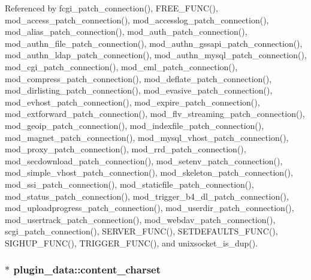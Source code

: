 Referenced by fcgi\-\_\-patch\-\_\-connection(), F\-R\-E\-E\-\_\-\-F\-U\-N\-C(), mod\-\_\-access\-\_\-patch\-\_\-connection(), mod\-\_\-accesslog\-\_\-patch\-\_\-connection(), mod\-\_\-alias\-\_\-patch\-\_\-connection(), mod\-\_\-auth\-\_\-patch\-\_\-connection(), mod\-\_\-authn\-\_\-file\-\_\-patch\-\_\-connection(), mod\-\_\-authn\-\_\-gssapi\-\_\-patch\-\_\-connection(), mod\-\_\-authn\-\_\-ldap\-\_\-patch\-\_\-connection(), mod\-\_\-authn\-\_\-mysql\-\_\-patch\-\_\-connection(), mod\-\_\-cgi\-\_\-patch\-\_\-connection(), mod\-\_\-cml\-\_\-patch\-\_\-connection(), mod\-\_\-compress\-\_\-patch\-\_\-connection(), mod\-\_\-deflate\-\_\-patch\-\_\-connection(), mod\-\_\-dirlisting\-\_\-patch\-\_\-connection(), mod\-\_\-evasive\-\_\-patch\-\_\-connection(), mod\-\_\-evhost\-\_\-patch\-\_\-connection(), mod\-\_\-expire\-\_\-patch\-\_\-connection(), mod\-\_\-extforward\-\_\-patch\-\_\-connection(), mod\-\_\-flv\-\_\-streaming\-\_\-patch\-\_\-connection(), mod\-\_\-geoip\-\_\-patch\-\_\-connection(), mod\-\_\-indexfile\-\_\-patch\-\_\-connection(), mod\-\_\-magnet\-\_\-patch\-\_\-connection(), mod\-\_\-mysql\-\_\-vhost\-\_\-patch\-\_\-connection(), mod\-\_\-proxy\-\_\-patch\-\_\-connection(), mod\-\_\-rrd\-\_\-patch\-\_\-connection(), mod\-\_\-secdownload\-\_\-patch\-\_\-connection(), mod\-\_\-setenv\-\_\-patch\-\_\-connection(), mod\-\_\-simple\-\_\-vhost\-\_\-patch\-\_\-connection(), mod\-\_\-skeleton\-\_\-patch\-\_\-connection(), mod\-\_\-ssi\-\_\-patch\-\_\-connection(), mod\-\_\-staticfile\-\_\-patch\-\_\-connection(), mod\-\_\-status\-\_\-patch\-\_\-connection(), mod\-\_\-trigger\-\_\-b4\-\_\-dl\-\_\-patch\-\_\-connection(), mod\-\_\-uploadprogress\-\_\-patch\-\_\-connection(), mod\-\_\-userdir\-\_\-patch\-\_\-connection(), mod\-\_\-usertrack\-\_\-patch\-\_\-connection(), mod\-\_\-webdav\-\_\-patch\-\_\-connection(), scgi\-\_\-patch\-\_\-connection(), S\-E\-R\-V\-E\-R\-\_\-\-F\-U\-N\-C(), S\-E\-T\-D\-E\-F\-A\-U\-L\-T\-S\-\_\-\-F\-U\-N\-C(), S\-I\-G\-H\-U\-P\-\_\-\-F\-U\-N\-C(), T\-R\-I\-G\-G\-E\-R\-\_\-\-F\-U\-N\-C(), and unixsocket\-\_\-is\-\_\-dup().

\hypertarget{structplugin__data_afb8a19d4470e8fabbba8920add8c381e}{
\subsubsection[{content\-\_\-charset}]{$\ast$ plugin\-\_\-data\-::content\-\_\-charset}}\label{structplugin__data_afb8a19d4470e8fabbba8920add8c381e}


